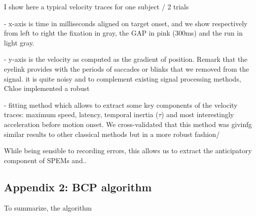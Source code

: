 \documentclass[profile,final,english, draft]{article}%
\begin{document}
I show here a typical velocity traces for one subject / 2 trials

- x-axis is time in milliseconds aligned on target onset,
and we show respectively from left to right the fixation in gray,
the GAP in pink (300ms) and the run in light gray.

- y-axis is the velocity as computed as the gradient of position.
Remark that the eyelink provides with the periods of saccades or
 blinks that we removed from the signal. it is quite noisy and
 to complement existing signal processing methods,
 Chloe implemented a robust

- fitting method which allows to extract some key components of
the velocity traces: maximum speed, latency, temporal inertia ($\tau$)
 and most interestingly acceleration before motion onset.
 We cross-validated that this method was givinfg similar results
  to other classical methods but in a more robust fashion/

While being sensible to recording errors, this allows us to extract the
 anticipatory component of SPEMs and..


\subsection{Appendix 2: BCP algorithm}
\label{app:bcp}

To summarize, the algorithm %
\end{document}
